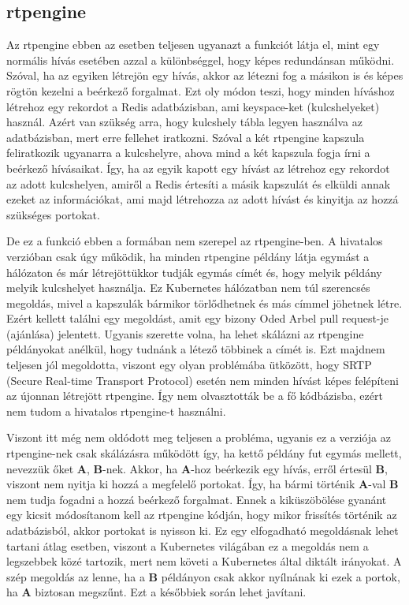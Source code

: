 \subsection{rtpengine}

Az rtpengine ebben az esetben teljesen ugyanazt a funkciót látja el, mint egy normális hívás
esetében azzal a különbséggel, hogy képes redundánsan működni. Szóval, ha az egyiken létrejön
egy hívás, akkor az létezni fog a másikon is és képes rögtön kezelni a beérkező forgalmat. Ezt
oly módon teszi, hogy minden híváshoz létrehoz egy rekordot a Redis adatbázisban, ami 
keyspace-ket (kulcshelyeket) használ. Azért van szükség arra, hogy kulcshely tábla legyen
használva az adatbázisban, mert erre fellehet iratkozni. Szóval a két rtpengine kapszula
feliratkozik ugyanarra a kulcshelyre, ahova mind a két kapszula fogja írni a beérkező hívásaikat.
Így, ha az egyik kapott egy hívást az létrehoz egy rekordot az adott kulcshelyen, amiről a 
Redis értesíti a másik kapszulát és elküldi annak ezeket az információkat, ami majd létrehozza
az adott hívást és kinyitja az hozzá szükséges portokat.  

De ez a funkció ebben a formában nem szerepel az rtpengine-ben. A hivatalos verzióban csak úgy 
működik, ha minden rtpengine példány látja egymást a hálózaton és már létrejöttükkor tudják
egymás címét és, hogy melyik példány melyik kulcshelyet használja. Ez Kubernetes hálózatban
nem túl szerencsés megoldás, mivel a kapszulák bármikor törlődhetnek és más címmel jöhetnek 
létre. Ezért kellett találni egy megoldást, amit egy bizony Oded Arbel pull request-je (ajánlása)
\cite{oded} jelentett. Ugyanis szerette volna, ha lehet skálázni az rtpengine példányokat anélkül, hogy 
tudnánk a létező többinek a címét is. Ezt majdnem teljesen jól megoldotta, viszont egy olyan 
problémába ütközött, hogy SRTP (Secure Real-time Transport Protocol) esetén nem minden hívást képes 
felépíteni az újonnan létrejött rtpengine. Így nem olvasztották be a fő kódbázisba, ezért nem tudom a 
hivatalos rtpengine-t használni.

Viszont itt még nem oldódott meg teljesen a probléma, ugyanis ez a verziója az rtpengine-nek csak
skálázásra működött így, ha kettő példány fut egymás mellett, nevezzük őket \textbf{A}, 
\textbf{B}-nek. Akkor, ha \textbf{A}-hoz beérkezik egy hívás, erről értesül \textbf{B}, viszont nem
nyitja ki hozzá a megfelelő portokat. Így, ha bármi történik \textbf{A}-val \textbf{B} nem tudja
fogadni a hozzá beérkező forgalmat. Ennek a kiküszöbölése gyanánt egy kicsit módosítanom 
kell az rtpengine kódján, hogy mikor frissítés történik az adatbázisból, akkor portokat is nyisson ki.
Ez egy elfogadható megoldásnak lehet tartani átlag esetben, viszont a Kubernetes világában
ez a megoldás nem a legszebbek közé tartozik, mert nem követi a Kubernetes által diktált
irányokat. A szép megoldás az lenne, ha a \textbf{B} példányon csak akkor nyílnának ki ezek a 
portok, ha \textbf{A} biztosan megszűnt. Ezt a későbbiek során lehet javítani. \\

